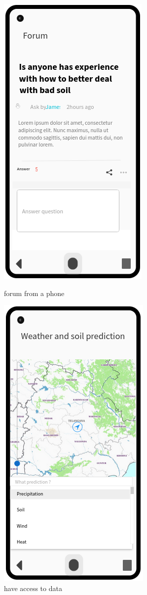 \begin{figure}[H]

	\begin{minipage}{0.48\textwidth}

		\centering

		\includegraphics[width=0.5\columnwidth]{Images/forum.png}

		\caption{forum from a phone}

		\label{Fig:interface_forum}

	\end{minipage} %
	\begin{minipage}{0.48\textwidth}

		\centering

		\includegraphics[width=0.5\columnwidth]{Images/meteo.png}
		\caption{have access to data}


\end{minipage}
\end{figure}
